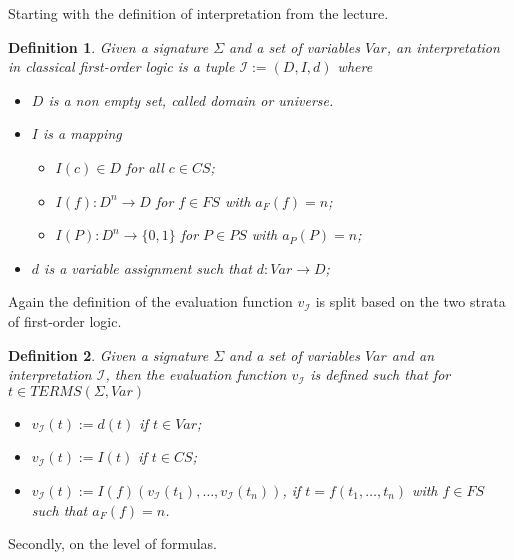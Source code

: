 \documentclass[11pt,a4paper]{article}
\newtheorem{mydef}{Definition}
\begin{document}
Starting with the definition of interpretation from the lecture.
 
\begin{mydef}
Given a signature $\Sigma$ and a set of variables $Var$, an interpretation in classical first-order logic is a tuple $\mathcal{I}:=(D, I, d)$ where
\begin{itemize}
\item $D$ is a non empty set, called domain or universe.
\item $I$ is a mapping 
\begin{itemize}
\item $I(c) \in D$ for all $c \in CS$;
\item $I(f):D^n \to D$ for $f \in FS$ with $a_F(f)=n$;
\item $I(P):D^n \to \{0,1\}$ for $P \in PS$ with $a_P(P)=n$;
\end{itemize}
\item $d$ is a variable assignment such that $d:Var \to D$;
\end{itemize}
\end{mydef}

Again the definition of the evaluation function $v_{\mathcal{I}}$ is split based on the two strata of first-order logic.



\begin{mydef}
Given a signature $\Sigma$ and a set of variables $Var$ and an interpretation $\mathcal{I}$, then the evaluation function $v_{\mathcal{I}}$ is defined such that for $t \in TERMS(\Sigma,Var)$
\begin{itemize}
\item $v_{\mathcal{I}}(t):=d(t)$ if $t\in Var$;
\item $v_{\mathcal{I}}(t):=I(t)$ if $t\in CS$;
\item $v_{\mathcal{I}}(t):= I(f)(v_{\mathcal{I}}(t_1),\dots,v_{\mathcal{I}}(t_n))$, if $t=f(t_1,\dots,t_n)$ with $f \in FS$ such that $a_F(f)=n$.
\end{itemize}
\end{mydef}

Secondly, on the level of formulas. 
\end{document}
